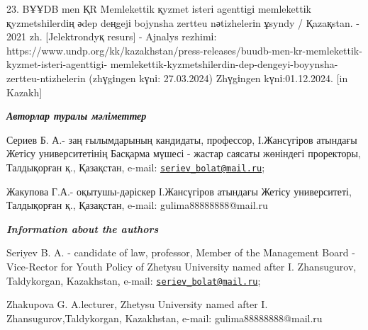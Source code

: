 23. BҰҰDB men ҚR Memlekettіk қyzmet іsterі agenttіgі memlekettіk
қyzmetshіlerdің әdep deңgejі bojynsha zertteu nәtizhelerіn ұsyndy /
Қazaқstan. - 2021 zh. {[}Jelektrondyқ resurs{]} - Ajnalys rezhimі:
https://www.undp.org/kk/kazakhstan/press-releases/buudb-men-kr-memlekettik-kyzmet-isteri-agenttigi-
memlekettik-kyzmetshilerdin-dep-dengeyi-boyynsha-zertteu-ntizhelerin
(zhүgіngen kүnі: 27.03.2024) Zhүgіngen kүnі:01.12.2024. {[}in Kazakh{]}

\emph{{\bfseries Авторлар туралы мәліметтер}}

Сериев Б. А.- заң ғылымдарының кандидаты, профессор, І.Жансүгіров
атындағы Жетісу университетінің Басқарма мүшесі - жастар саясаты
жөніндегі проректоры, Талдықорған қ., Қазақстан, e-mail:
\href{mailto:seriev_bolat@mail.ru}{\nolinkurl{seriev\_bolat@mail.ru}};

Жакупова Г.А.- оқытушы-дәріскер І.Жансүгіров атындағы Жетісу
университеті, Талдықорған қ., Қазақстан, e-mail: gulima88888888@mail.ru

\emph{{\bfseries Information about the authors}}

Seriyev B. A. - candidate of law, professor, Member of the Management
Board - Vice-Rector for Youth Policy of Zhetysu University named after
I. Zhansugurov, Taldykorgan, Kazakhstan, e-mail:
\href{mailto:seriev_bolat@mail.ru}{\nolinkurl{seriev\_bolat@mail.ru}};

Zhakupova G. A.lecturer, Zhetysu University named after I.
Zhansugurov,Taldykorgan, Kazakhstan, e-mail: gulima88888888@mail.ru